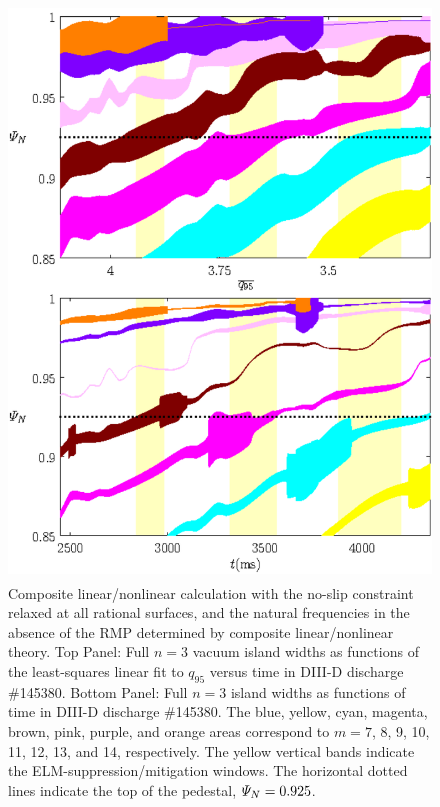 \documentclass[12pt,prb,aps]{revtex4-1}
\begin{document}
\begin{figure}
\includegraphics[height=6in]{fig10.pdf}
\caption{Composite linear/nonlinear calculation with the no-slip constraint relaxed at all rational surfaces, and  the natural frequencies
in the absence of the RMP determined by composite linear/nonlinear theory. Top Panel: Full  $n=3$ vacuum island widths as functions of the least-squares linear fit to $q_{95}$ versus time 
in   DIII-D discharge \#145380.
Bottom Panel:  Full $n=3$ island widths as functions of time
in   DIII-D discharge \#145380. The blue, yellow, cyan, magenta, brown, pink,
purple, and orange  areas correspond to $m=7$, 8, 9, 10, 11, 12, 13, and 14, respectively. The yellow vertical bands indicate the ELM-suppression/mitigation windows. 
The horizontal dotted lines indicate the top of the pedestal, ${\mit\Psi}_N=0.925$.} \label{fig10}
\end{figure}
\end{document}
